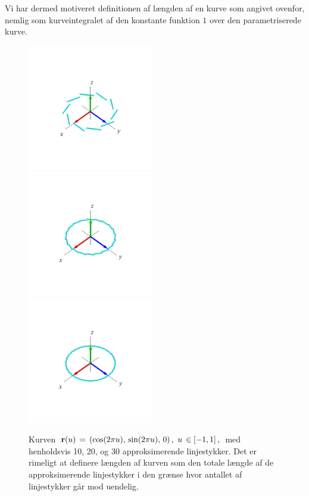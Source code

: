 Vi har dermed motiveret definitionen af længden af en kurve som
angivet ovenfor, nemlig som kurveintegralet af den konstante
funktion $1$ over den parametriserede kurve.


\begin{figure}[ht]
\centerline{\includegraphics[height=55mm]{FIGS/plotC1app}\,\,\,\,\,\includegraphics[height=55mm]{FIGS/plotC2app}\,\,\,\,\,\includegraphics[height=55mm]{FIGS/plotC3app}}
\begin{center}
\caption{ \small{Kurven ${\bf r}(u) \, = \,
\left(\cos(2\pi u), \,\sin(2\pi u),\, 0\right),
\, \, u \, \in [-1, 1]\, ,$ med henholdsvis 10, 20, og
30 approksimerende linjestykker. Det er
rimeligt at definere længden af kurven som den
totale længde af de approksimerende linjestykker
i den grænse hvor antallet af linjestykker går
mod uendelig.}} \label{figCircApprox123}
\end{center}
\end{figure}




